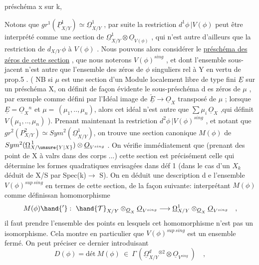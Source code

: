 
préschéma x sur k, 


Notons que $gr^1(\underline{P}^1_{X/Y}) \simeq \underline{\Omega}^1_{X/Y}$ , par suite la restriction
$d^1\phi\,|V(\phi)$ peut être interprété comme une section de $\underline{\Omega}^1_{X/Y} \otimes \underline{O}_{V(\phi)}$ ,
qui n'est autre d'ailleurs que la restriction de $d_{X/Y}\,\phi$ à $V(\phi)$ . Nous
pouvons alors considérer le \uline{préschéma des zéros de cette section} , que
nous noterons $V(\phi)^{sing}$ , et dont l'ensemble sous-jacent n'est autre
que l'ensemble des zéros de $\phi$ singuliers rel à Y en vertu de prop.5 .
( NB si  $\mu$ est une section d'un Module localement libre de type fini $\underline{E}$ sur un
\placedmargin{$\|$}préschéma  X, on définit de façon évidente le sous-préschéma d es
zéros de $\mu$ , par exemple comme défini par l'Idéal image de $\check{\underline{E}} \longrightarrow \underline{O}_X$
transposé de $\mu$ ; lorsque $\underline{E} = \underline{O}_X{}^n$ et $\mu = \,(\mu_1,..,\mu_n)$, alors cet
idéal n'est autre que $\sum \mu_i\,\underline{O}_X$ ,qui définit $V(\mu_1,..,\mu_n)$ ). Prenant
maintenant la restriction $d^2\phi\,|V(\phi)^{sing}$ , et notant que
$gr^2(P^2_{X/Y}) \simeq Sym^2(\underline{\Omega}^1_{X/Y})$, on trouve une section canonique $M(\phi)$ de
$Sym^2(\underline{\Omega}^{\,1}_{X/\unsure{Y|X}}) \otimes \underline{O}_{V^{sing}}$ . On vérifie immédiatement que (prenant des
\placedmargin{$\|$}point de X à valrs dans des corps ...) cette section est précisément
celle qui détermine les formes quadratiques envisagées dans déf 1
(dans le cas  d'un $X_k$ déduit de X/S par Spec(k)$\rightarrow$ S). On
en déduit une description d e l'ensemble $V(\phi)^{sup\ sing}$ en termes de
cette section, de la façon suivante: interprétant $M(\phi)$ comme définissan
homomorphisme
\[
M(\phi)\hand{'} : \ \hand{\mathcal{T}}_{X/Y} \otimes_{\underline{O}_X} \underline{O}_{V^{sing}} \longrightarrow \underline{\Omega}^1_{X/Y} \otimes_{\underline{O}_X} \underline{O}_{V^{sing}} \quad ,
\]
il faut prendre l'ensemble des points en lesquels cet homomorphisme
n'est pas un isomorphisme. Cela montre en particulier que $V(\phi)^{sup\ sing}$
est un ensemble fermé. On peut  préciser ce dernier introduisant
\[
D(\phi) = \text{dét}\ M(\phi) \ \in \ \Gamma\,(\underline{\Omega}^d_{X/Y}{}^{\otimes 2} \otimes \underline{O}_{V^{sing}}\ ) \quad ,
\]

